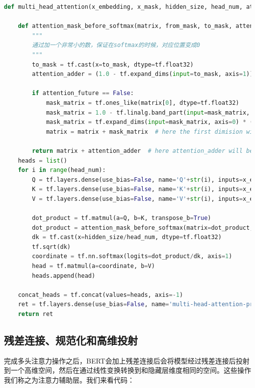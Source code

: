 \documentclass[twoside,a4paper,12pt]{book}%
\begin{document}
\begin{lstlisting}[language={Python}]
def multi_head_attention(x_embedding, x_mask, hidden_size, head_num, attention_future=True):

    def attention_mask_before_softmax(matrix, from_mask, to_mask, attention_future=True):
        """
        通过加一个非常小的数，保证在softmax的时候，对应位置变成0
        """
        to_mask = tf.cast(x=to_mask, dtype=tf.float32)
        attention_adder = (1.0 - tf.expand_dims(input=to_mask, axis=1)) * (-2.0 ** 31 + 1.0)

        if attention_future == False:
            mask_matrix = tf.ones_like(matrix[0], dtype=tf.float32)
            mask_matrix = 1.0 - tf.linalg.band_part(input=mask_matrix, num_lower=-1, num_upper=0)
            mask_matrix = tf.expand_dims(input=mask_matrix, axis=0) * (-2.0 ** 31 + 1.0)
            matrix = matrix + mask_matrix  # here the first dimision will be broadcast

        return matrix + attention_adder  # here attention_adder will be broadcast according to axis 1
    heads = list()
    for i in range(head_num):
        Q = tf.layers.dense(use_bias=False, name='Q'+str(i), inputs=x_embedding, units=hidden_size/head_num)
        K = tf.layers.dense(use_bias=False, name='K'+str(i), inputs=x_embedding, units=hidden_size/head_num)
        V = tf.layers.dense(use_bias=False, name='V'+str(i), inputs=x_embedding, units=hidden_size/head_num)

        dot_product = tf.matmul(a=Q, b=K, transpose_b=True)
        dot_product = attention_mask_before_softmax(matrix=dot_product, from_mask=x_mask, to_mask=x_mask)
        dk = tf.cast(x=hidden_size/head_num, dtype=tf.float32)
        tf.sqrt(dk)
        coordinate = tf.nn.softmax(logits=dot_product/dk, axis=1)
        head = tf.matmul(a=coordinate, b=V)
        heads.append(head)
    
    concat_heads = tf.concat(values=heads, axis=-1)
    ret = tf.layers.dense(use_bias=False, name='multi-head-attention-project', inputs=concat_heads, units=hidden_size)
    return ret
\end{lstlisting}

\subsection{残差连接、规范化和高维投射}
完成多头注意力操作之后，\gls{BERT}会加上残差连接后会将模型经过残差连接后投射到一个高维空间，然后在通过线性变换转换到和隐藏层维度相同的空间。这些操作我们称之为注意力辅助层。我们来看代码：
\end{document}
